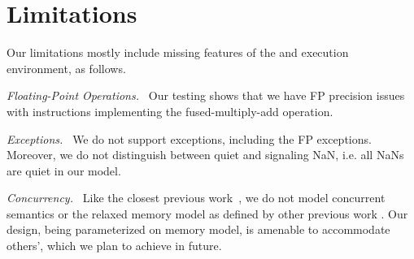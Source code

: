 \section{Limitations}\label{sec:limit}
Our limitations mostly include missing features of the \ISA and execution environment, as follows.

\emph{Floating-Point Operations.~}
Our testing shows that we have FP precision issues with instructions implementing the fused-multiply-add operation. 

\emph{Exceptions.~}
We do not support exceptions, including the FP exceptions. Moreover, we do not distinguish between quiet and signaling NaN, i.e. all NaNs are quiet in our model. 

\emph{Concurrency.~}
Like the closest previous work~\cite{Goel:FMCAD14,Heule2016a}, we do not model concurrent semantics or the relaxed memory model as defined by other previous work \cite{Sarkar:POPL09,Owens:x86-TSO}. Our design, being parameterized on memory model, is amenable to accommodate others', which we plan to achieve in future.

